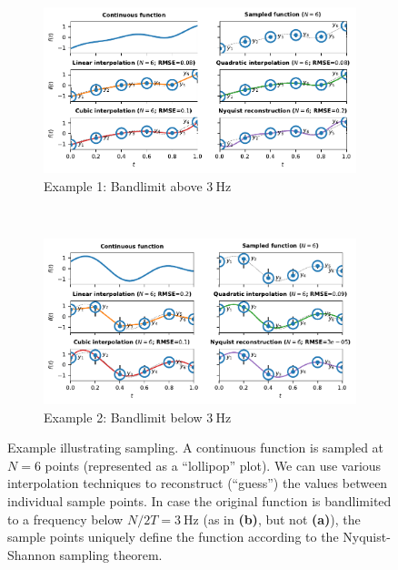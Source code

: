 \documentclass[10pt,letterpaper,oneside]{article}
\begin{document}
\begin{figure}
	\begin{subfigure}{\textwidth}
		\centering
		\includegraphics{media/fun_1_q6_small.pdf}
		\caption{Example 1: Bandlimit above $\SI{3}{\hertz}$}
	\end{subfigure}\\[0.5cm]
	\begin{subfigure}{\textwidth}
		\centering
		\includegraphics{media/fun_2_q6_small.pdf}
		\caption{Example 2: Bandlimit below $\SI{3}{\hertz}$}
	\end{subfigure}		
	\caption{Example illustrating sampling. A continuous function is sampled at $N = 6$ points (represented as a \enquote{lollipop} plot). We can use various interpolation techniques to reconstruct (\enquote{guess}) the values between individual sample points. In case the original function is bandlimited to a frequency below $N / {2T} = \SI{3}{\hertz}$ (as in \textbf{(b)}, but not \textbf{(a)}), the sample points uniquely define the function according to the Nyquist-Shannon sampling theorem.}
	\label{fig:sampling}
\end{figure}
\end{document}
